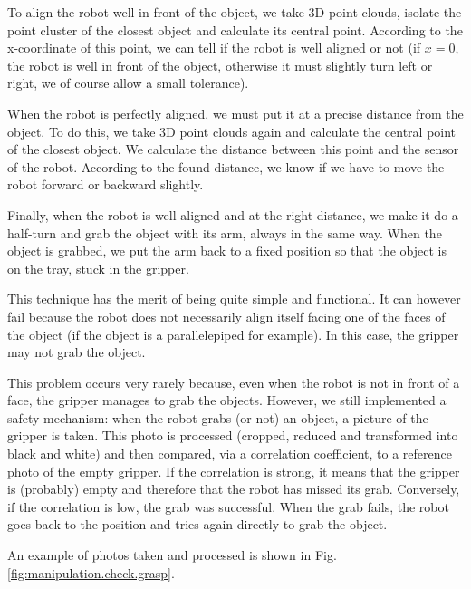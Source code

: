 \documentclass[a4paper, 10pt, conference]{ieeeconf}
\begin{document}
    To align the robot well in front of the object, we take 3D point clouds, isolate the point cluster of the closest object and calculate its central point. According to the x-coordinate of this point, we can tell if the robot is well aligned or not (if $x = 0$, the robot is well in front of the object, otherwise it must slightly turn left or right, we of course allow a small tolerance).
    
    When the robot is perfectly aligned, we must put it at a precise distance from the object. To do this, we take 3D point clouds again and calculate the central point of the closest object. We calculate the distance between this point and the sensor of the robot. According to the found distance, we know if we have to move the robot forward or backward slightly.
    
    Finally, when the robot is well aligned and at the right distance, we make it do a half-turn and grab the object with its arm, always in the same way. When the object is grabbed, we put the arm back to a fixed position so that the object is on the tray, stuck in the gripper.
    
    This technique has the merit of being quite simple and functional. It can however fail because the robot does not necessarily align itself facing one of the faces of the object (if the object is a parallelepiped for example). In this case, the gripper may not grab the object.
    
    This problem occurs very rarely because, even when the robot is not in front of a face, the gripper manages to grab the objects. However, we still implemented a safety mechanism: when the robot grabs (or not) an object, a picture of the gripper is taken. This photo is processed (cropped, reduced and transformed into black and white) and then compared, via a correlation coefficient, to a reference photo of the empty gripper. If the correlation is strong, it means that the gripper is (probably) empty and therefore that the robot has missed its grab. Conversely, if the correlation is low, the grab was successful. When the grab fails, the robot goes back to the position and tries again directly to grab the object.
    
    An example of photos taken and processed is shown in Fig. \ref{fig:manipulation.check.grasp}.
    
\end{document}
